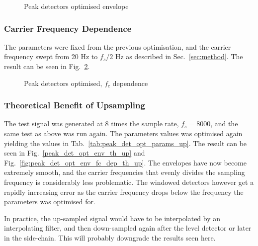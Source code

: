 \documentclass[../main2.tex]{subfiles}
\providecommand{\rootdir}{..}
\begin{document}
\begin{figure}[h]
\centerline{}
\caption{Peak detectors optimised envelope}
\label{fig:peak_det_opt_env}
\end{figure}

\subsubsection{Carrier Frequency Dependence}
The parameters were fixed from the previous optimisation, and the carrier frequency swept from 20 Hz to $f_s/2$ Hz as described in Sec.~\ref{sec:method}. The result can be seen in Fig.~\ref{fig:peak_det_opt_env_fc_dep}.

\begin{figure}[h]
\centerline{}
\caption{Peak detectors optimised, $f_c$ dependence}
\label{fig:peak_det_opt_env_fc_dep}
\end{figure}

\subsubsection{Theoretical Benefit of Upsampling}
The test signal was generated at 8 times the sample rate, $f_s = 8000$, and the same test as above was run again. The parameters values was optimised again yielding the values in Tab.~\ref{tab:peak_det_opt_params_up}. The result can be seen in Fig.~\ref{peak_det_opt_env_th_up} and Fig.~\ref{fig:peak_det_opt_env_fc_dep_th_up}.
The envelopes have now become extremely smooth, and the carrier frequencies that evenly divides the sampling frequency is considerably less problematic. The windowed detectors however get a rapidly increasing error as the carrier frequency drops below the frequency the parameters was optimised for.

In practice, the up-sampled signal would have to be interpolated by an interpolating filter, and then down-sampled again after the level detector or later in the side-chain. This will probably downgrade the results seen here.
\end{document}
